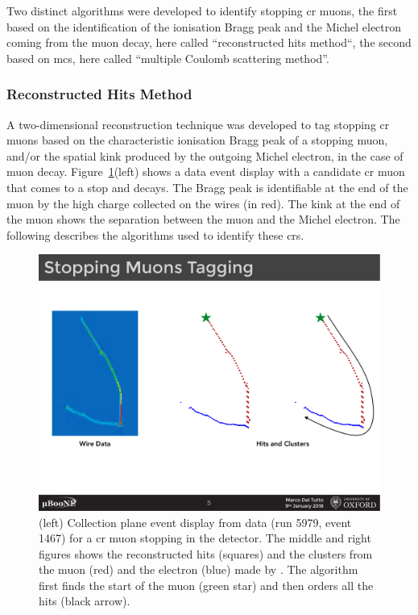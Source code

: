 Two distinct algorithms were developed to identify stopping \acrshort{cr} muons, the first based on the identification of the ionisation Bragg peak and the Michel electron coming from the muon decay, here called ``reconstructed hits method``, the second based on \acrfull{mcs}, here called ``multiple Coulomb scattering method''.


\subsubsection{Reconstructed Hits Method}

A two-dimensional reconstruction technique was developed to tag stopping \acrshort{cr} muons based on the characteristic ionisation Bragg peak of a stopping muon, and/or the spatial kink produced by the outgoing Michel electron, in the case of muon decay. Figure~\ref{fig:stopping_muon_tagger_cartoon}(left) shows a data event display with a candidate \acrshort{cr} muon that comes to a stop and decays. The Bragg peak is identifiable at the end of the muon by the high charge collected on the wires (in red). The kink at the end of the muon shows the separation between the muon and the Michel electron. The following describes the algorithms used to identify these  \acrshort{cr}s.

\begin{figure}[]
\centering
\includegraphics[width=.80\textwidth]{images/StoppingMuonTagger/stopping_muon_tagger_cartoon}
\caption[Cosmic Ray Stopping Muon]{(left) Collection plane event display from data (run 5979, event 1467) for a \acrshort{cr} muon stopping in the detector. The middle and right figures shows the reconstructed hits (squares) and the clusters from the muon (red) and the electron (blue) made by \pc. The algorithm first finds the start of the muon (green star) and then orders all the hits (black arrow).}
\label{fig:stopping_muon_tagger_cartoon}
\end{figure}

